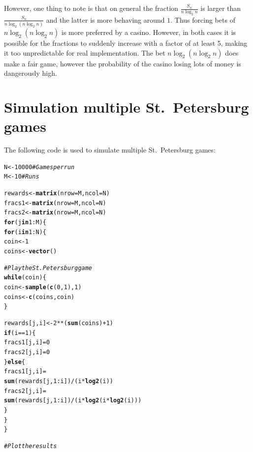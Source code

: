 \documentclass[twoside,a4paper]{article}
\makeatletter
\theoremstyle{plain}
\theoremstyle{definition}
\theoremstyle{remark}
\numberwithin{equation}{section}
\DeclareMathOperator{\1}{\mathbbm{1}}
\newcommand{\hlnum}[1]{\textcolor[rgb]{0.686,0.059,0.569}{#1}}%
\newcommand{\hlcom}[1]{\textcolor[rgb]{0.678,0.584,0.686}{\textit{#1}}}%
\newcommand{\hlopt}[1]{\textcolor[rgb]{0,0,0}{#1}}%
\newcommand{\hlstd}[1]{\textcolor[rgb]{0.345,0.345,0.345}{#1}}%
\newcommand{\hlkwa}[1]{\textcolor[rgb]{0.161,0.373,0.58}{\textbf{#1}}}%
\newcommand{\hlkwb}[1]{\textcolor[rgb]{0.69,0.353,0.396}{#1}}%
\newcommand{\hlkwc}[1]{\textcolor[rgb]{0.333,0.667,0.333}{#1}}%
\newcommand{\hlkwd}[1]{\textcolor[rgb]{0.737,0.353,0.396}{\textbf{#1}}}%
\newenvironment{kframe}{%
 \def\at@end@of@kframe{}%
 \ifinner\ifhmode%
  \def\at@end@of@kframe{\end{minipage}}%
  \begin{minipage}{\columnwidth}%
 \fi\fi%
 \def\FrameCommand##1{\hskip\@totalleftmargin \hskip-\fboxsep
 \colorbox{shadecolor}{##1}\hskip-\fboxsep
     \hskip-\linewidth \hskip-\@totalleftmargin \hskip\columnwidth}%
 \MakeFramed {\advance\hsize-\width
   \@totalleftmargin\z@ \linewidth\hsize
   \@setminipage}}%
 {\par\unskip\endMakeFramed%
 \at@end@of@kframe}
\newenvironment{knitrout}{}{} %
\makeatother
\begin{document}
However, one thing to note is that on general the fraction $\frac{S_n}{n\log_2 n}$ is larger than $\frac{S_n}{n\log_2 (n\log_2 n)}$ and the latter is more behaving around $1$. Thus forcing bets of $n\log_2 (n\log_2 n)$ is more preferred by a casino. However, in both cases it is possible for the fractions to suddenly increase with a factor of at least 5, making it too unpredictable for real implementation. The bet $n\log_2(n\log_2 n)$ does make a fair game, however the probability of the casino losing lots of money is dangerously high.

\newpage



\newpage
\appendix
\section{Simulation multiple St.~Petersburg games}\label{sec:petersburgcode}
The following code is used to simulate multiple St.~Petersburg games:
\begin{knitrout}
\color{fgcolor}\begin{kframe}
\begin{alltt}
\hlstd{N} \hlkwb{<-} \hlnum{10000} \hlcom{# Games per run}
\hlstd{M} \hlkwb{<-} \hlnum{10}    \hlcom{# Runs}

\hlstd{rewards} \hlkwb{<-} \hlkwd{matrix}\hlstd{(}\hlkwc{nrow}\hlstd{=M,} \hlkwc{ncol}\hlstd{=N)}
\hlstd{fracs1} \hlkwb{<-} \hlkwd{matrix}\hlstd{(}\hlkwc{nrow}\hlstd{=M,} \hlkwc{ncol}\hlstd{=N)}
\hlstd{fracs2} \hlkwb{<-} \hlkwd{matrix}\hlstd{(}\hlkwc{nrow}\hlstd{=M,} \hlkwc{ncol}\hlstd{=N)}
\hlkwa{for} \hlstd{(j} \hlkwa{in} \hlnum{1}\hlopt{:}\hlstd{M) \{}
  \hlkwa{for} \hlstd{(i} \hlkwa{in} \hlnum{1}\hlopt{:}\hlstd{N) \{}
    \hlstd{coin} \hlkwb{<-} \hlnum{1}
    \hlstd{coins} \hlkwb{<-} \hlkwd{vector}\hlstd{()}

    \hlcom{# Play the St. Petersburg game}
    \hlkwa{while}\hlstd{(coin) \{}
      \hlstd{coin} \hlkwb{<-} \hlkwd{sample}\hlstd{(}\hlkwd{c}\hlstd{(}\hlnum{0}\hlstd{,} \hlnum{1}\hlstd{),} \hlnum{1}\hlstd{)}
      \hlstd{coins} \hlkwb{<-} \hlkwd{c}\hlstd{(coins, coin)}
    \hlstd{\}}

    \hlstd{rewards[j,i]} \hlkwb{<-} \hlnum{2}\hlopt{**}\hlstd{(}\hlkwd{sum}\hlstd{(coins)}\hlopt{+}\hlnum{1}\hlstd{)}
    \hlkwa{if} \hlstd{(i} \hlopt{==} \hlnum{1}\hlstd{) \{}
      \hlstd{fracs1[j,i]} \hlkwb{=} \hlnum{0}
      \hlstd{fracs2[j,i]} \hlkwb{=} \hlnum{0}
    \hlstd{\}} \hlkwa{else} \hlstd{\{}
      \hlstd{fracs1[j,i]} \hlkwb{=}
        \hlkwd{sum}\hlstd{(rewards[j,}\hlnum{1}\hlopt{:}\hlstd{i])}\hlopt{/}\hlstd{(i}\hlopt{*}\hlkwd{log2}\hlstd{(i))}
      \hlstd{fracs2[j,i]} \hlkwb{=}
        \hlkwd{sum}\hlstd{(rewards[j,}\hlnum{1}\hlopt{:}\hlstd{i])}\hlopt{/}\hlstd{(i}\hlopt{*}\hlkwd{log2}\hlstd{(i}\hlopt{*}\hlkwd{log2}\hlstd{(i)))}
    \hlstd{\}}
  \hlstd{\}}
\hlstd{\}}

\hlcom{# Plot the results}
\end{alltt}
\end{kframe}
\end{knitrout}
\end{document}
